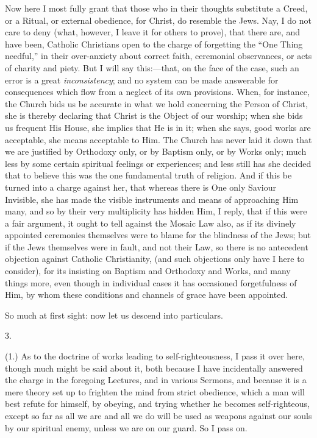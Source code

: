 Now here I most fully grant that those who in their thoughts
substitute a Creed, or a Ritual, or external obedience, for Christ, do
resemble the Jews. Nay, I do not care to deny (what, however, I leave
it for others to prove), that there are, and have been, Catholic
Christians open to the charge of forgetting the ``One Thing
needful,'' in their over-anxiety about correct faith, ceremonial
observances, or acts of charity and piety. But I will say this:—that,
on the face of the case, such an error is a great \emph{inconsistency};
and no system can be made answerable for consequences which flow from
a neglect of its own provisions. When, for instance, the Church bids
us be accurate in what we hold concerning the Person of Christ, she is
thereby declaring that Christ is the Object of our worship; when she
bids us frequent His House, she implies that He is in it; when she
says, good works are acceptable, she means acceptable to Him. The
Church has never laid it down that we are justified by Orthodoxy only,
or by Baptism only, or by Works only; much less by some certain
spiritual feelings or experiences; and less still has she decided that
to believe this was the one fundamental truth of religion. And if this
be turned into a charge against her, that whereas there is One only
Saviour Invisible, she has made the visible instruments and means of
approaching Him many, and so by their very multiplicity has hidden
Him, I reply, that if this were a fair argument, it ought to
tell against the Mosaic Law also, as if its divinely appointed
ceremonies themselves were to blame for the blindness of the Jews; but
if the Jews themselves were in fault, and not their Law, so there is
no antecedent objection against Catholic Christianity, (and such
objections only have I here to consider), for its insisting on Baptism
and Orthodoxy and Works, and many things more, even though in
individual cases it has occasioned forgetfulness of Him, by whom these
conditions and channels of grace have been appointed.

So much at first sight: now let us descend into particulars.

3.

(1.) As to the doctrine of works leading to self-righteousness, I
pass it over here, though much might be said about it, both because I
have incidentally answered the charge in the foregoing Lectures, and
in various Sermons, and because it is a mere theory set up to frighten
the mind from strict obedience, which a man will best refute for
himself, by obeying, and trying whether he becomes self-righteous,
except so far as all we are and all we do will be used as weapons
against our souls by our spiritual enemy, unless we are on our guard.
So I pass on.

